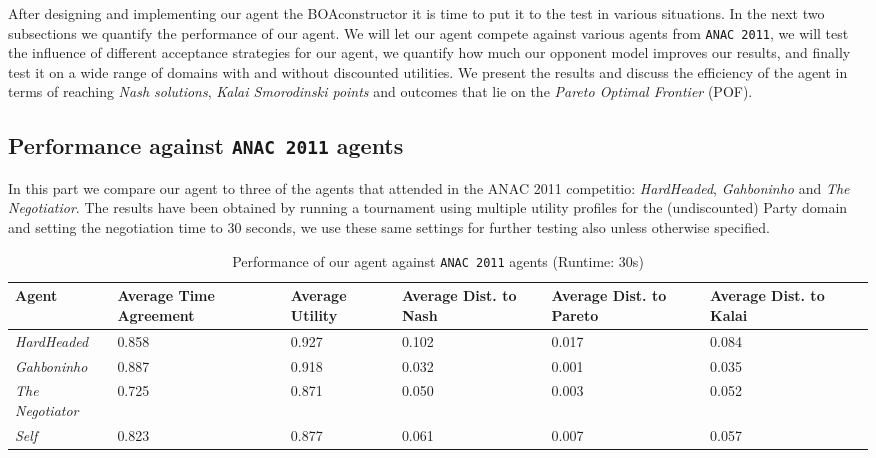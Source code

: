 After designing and implementing our agent the BOAconstructor it is time to put it to the test in various situations. In the next two subsections we quantify the performance of our agent. 
We will let our agent compete against various agents from \texttt{ANAC 2011}, we will test the influence of different acceptance strategies for our agent,
we quantify how much our opponent model improves our results, and finally test it on a wide range of domains with and without discounted utilities.
We present the results and discuss the efficiency of the agent in terms of reaching \emph{Nash solutions}, \emph{Kalai Smorodinski points} and outcomes that lie on the \emph{Pareto Optimal Frontier} (POF).

\subsection{Performance against \texttt{ANAC 2011} agents}

In this part we compare our agent to three of the agents that attended in the ANAC 2011 competitio: \emph{HardHeaded}, \emph{Gahboninho} and \emph{The Negotiatior}. The results have been obtained by running a tournament using multiple utility profiles for the (undiscounted) Party domain and setting the negotiation time to $30$ seconds,
we use these same settings for further testing also unless otherwise specified. 

\begin{table}[H]
	\centering
	\small
    \begin{tabular}{m{2cm}m{2cm}m{2cm}m{2cm}m{2cm}m{2cm}m{2cm}}
    \toprule
    Agent                       & Average Time Agreement & Average Utility & Average Dist. to Nash & Average Dist. to Pareto & Average Dist. to Kalai \\
    \midrule
    \emph{HardHeaded}		& 0.858  & 0.927  & 0.102  & 0.017  & 0.084   \\ 
    \emph{Gahboninho}   	& 0.887  & 0.918  & 0.032  & 0.001  & 0.035   \\ 
    \emph{The Negotiator} 	& 0.725  & 0.871  & 0.050  & 0.003  & 0.052   \\ 
    \emph{Self}                 & 0.823  & 0.877  & 0.061  & 0.007  & 0.057   \\
    \bottomrule
    \end{tabular}
    \caption{Performance of our agent against \texttt{ANAC 2011} agents (Runtime: $30$s) \label{table:anac2011-results}}
\end{table}

